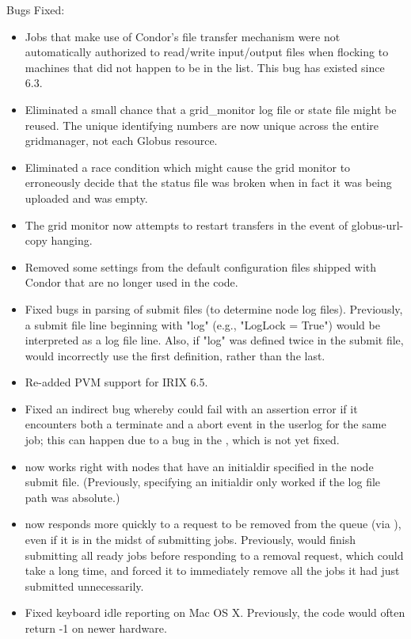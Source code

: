 \noindent Bugs Fixed:

\begin{itemize}

\item Jobs that make use of Condor's file transfer mechanism were not
automatically authorized to read/write input/output files when
flocking to machines that did not happen to be in the
 list.  This bug has existed since 6.3.

\item Eliminated a small chance that a grid\_monitor log file or state file
    might be reused.  The unique identifying numbers are now unique across
	the entire gridmanager, not each Globus resource.

\item Eliminated a race condition which might cause the grid monitor to
	erroneously decide that the status file was broken when in fact it
	was being uploaded and was empty.

\item The grid monitor now attempts to restart transfers in the event of
    globus-url-copy hanging.

\item Removed some settings from the default configuration files
  shipped with Condor that are no longer used in the code.

\item Fixed bugs in  parsing of submit files (to determine
  node log files).  Previously, a submit file line beginning with
  "log" (e.g., "LogLock = True") would be interpreted as a log file
  line.  Also, if "log" was defined twice in the submit file,
   would incorrectly use the first definition, rather than
  the last.

\item Re-added PVM support for IRIX 6.5.

\item Fixed an indirect bug whereby  could fail with an
assertion error if it encounters both a terminate and a abort event in
the userlog for the same job; this can happen due to a bug in the
, which is not yet fixed.

\item {} now works right with nodes that have an initialdir
  specified in the node submit file.  (Previously, specifying
  an initialdir only worked if the log file path was absolute.)

\item {} now responds more quickly to a request to be
      removed from the queue (via ), even if it is in the
      midst of submitting jobs.  Previously,  would
      finish submitting all ready jobs before responding to a removal
      request, which could take a long time, and forced it to
      immediately remove all the jobs it had just submitted
      unnecessarily.

\item Fixed keyboard idle reporting on Mac OS X. Previously, the code
      would often return -1 on newer hardware. 

\end{itemize}

